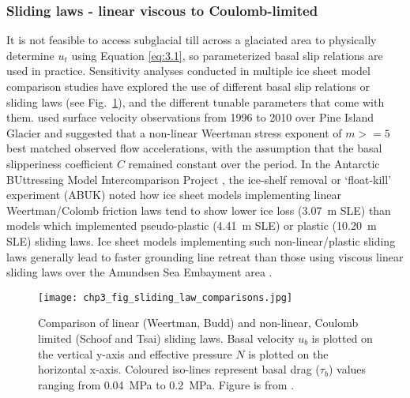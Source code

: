 \subsubsection{Sliding laws - linear viscous to Coulomb-limited}


It is not feasible to access subglacial till across a glaciated area to physically determine $u_t$ using Equation \eqref{eq:3.1}, so parameterized basal slip relations are used in practice.
Sensitivity analyses conducted in multiple ice sheet model comparison studies \citep[e.g.][]{SeroussiinitMIPAntarcticaicesheet2019,SunAntarcticicesheet2020,ZhangcomparisontwoStokes2017} have explored the use of different basal slip relations or sliding laws (see Fig.~\ref{fig:sliding_laws}), and the different tunable parameters that come with them.
\citet{Gillet-ChauletAssimilationsurfacevelocities2016} used surface velocity observations from 1996 to 2010 over Pine Island Glacier and suggested that a non-linear Weertman stress exponent of $m >= 5$ best matched observed flow accelerations, with the assumption that the basal slipperiness coefficient $C$ remained constant over the period.
In the Antarctic BUttressing Model Intercomparison Project \citep[ABUMIP;][]{SunAntarcticicesheet2020}, the ice-shelf removal or `float-kill' experiment (ABUK) noted how ice sheet models implementing linear Weertman/Colomb friction laws tend to show lower ice loss (\SI{3.07}{\metre} \gls{SLE}) than models which implemented pseudo-plastic (\SI{4.41}{\metre} \gls{SLE}) or plastic (\SI{10.20}{\metre} \gls{SLE}) sliding laws.
Ice sheet models implementing such non-linear/plastic sliding laws generally lead to faster grounding line retreat than those using viscous linear sliding laws over the Amundsen Sea Embayment area \citep[e.g.][]{JoughinBasalconditionsPine2009,RitzPotentialsealevelrise2015,BrondexSensitivitygroundingline2017,BulthuisUncertaintyquantificationmulticentennial2019}.

\begin{figure}[htbp]
  \texttt{[image: chp3\_fig\_sliding\_law\_comparisons.jpg]}
  \caption[Comparison of Weertman, Budd, Schoof and Tsai sliding laws]{
    Comparison of linear (Weertman, Budd) and non-linear, Coulomb limited (Schoof and Tsai) sliding laws.
    Basal velocity $u_b$ is plotted on the vertical y-axis and effective pressure $N$ is plotted on the horizontal x-axis.
    Coloured iso-lines represent basal drag ($\tau_b$) values ranging from \SI{0.04}{\mega\pascal} to \SI{0.2}{\mega\pascal}.
    Figure is from \citet{BrondexSensitivitygroundingline2017}.
  }
  \label{fig:sliding_laws}
\end{figure}

